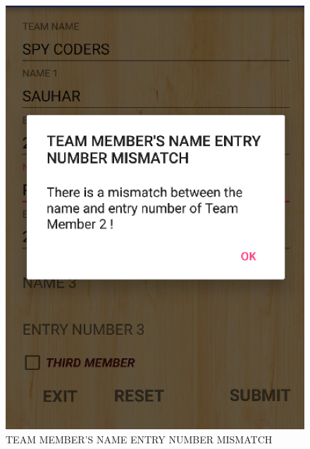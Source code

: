 \documentclass[12pt]{article}
\begin{document}
\begin{itemize}
\begin{figure}
	\centering
	\includegraphics[scale=.7]{TEAM_MEMBER'S_NAME_ENTRY_NUMBER_MISMATCH.png}
	\caption{TEAM MEMBER'S NAME ENTRY NUMBER MISMATCH}
\end{figure}


\end{itemize}
\end{document}

